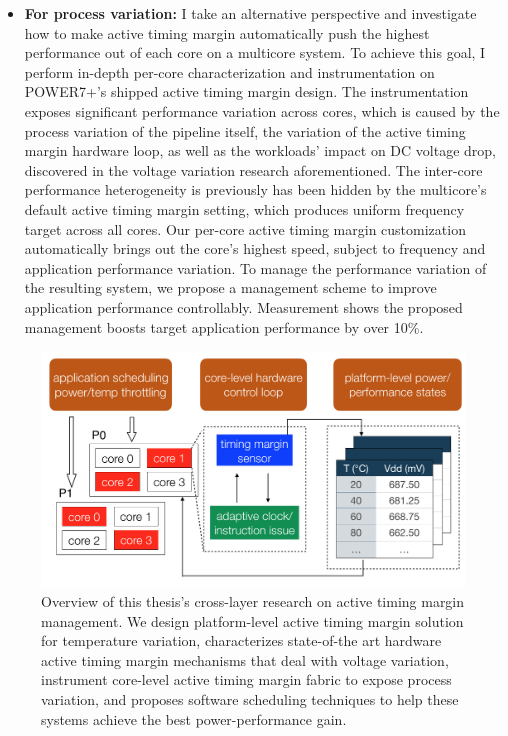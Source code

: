\begin{itemize}
\item \textbf{For process variation:} I take an alternative perspective and investigate how to make active timing margin automatically push the highest performance out of each core on a multicore system. To achieve this goal, I perform in-depth per-core characterization and instrumentation on POWER7+'s shipped active timing margin design. The instrumentation exposes significant performance variation across cores, which is caused by the process variation of the pipeline itself, the variation of the active timing margin hardware loop, as well as the workloads' impact on DC voltage drop, discovered in the voltage variation research aforementioned. The inter-core performance heterogeneity is previously has been hidden by the multicore's default active timing margin setting, which produces
uniform frequency target across all cores. Our per-core active timing margin customization automatically brings out the core's highest speed, subject to frequency and application performance variation. To manage the performance variation of the resulting system, we propose a management scheme to improve application performance controllably. Measurement shows the proposed management boosts target application performance by over 10\%.

\end{itemize}

\begin{figure}
  \centering
  \includegraphics[trim=0 0 0 0, clip, width=\columnwidth]{graphs/intro/sys-overview.png}
  \caption{Overview of this thesis's cross-layer research on active timing margin management. We design platform-level active timing margin solution for temperature variation, characterizes state-of-the art hardware active timing margin mechanisms that deal with voltage variation, instrument core-level active timing margin fabric to expose process variation, and proposes software scheduling techniques to help these systems achieve the best power-performance gain.}
  \label{fig:framework}
\end{figure}

